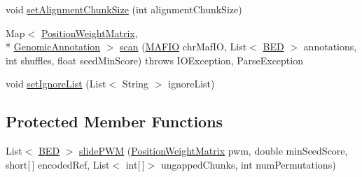 \begin{DoxyCompactItemize}
void \hyperlink{classbroad_1_1core_1_1siphy_1_1_conserved_p_w_m_scanner_a3f966e649abcf8c8215cd049493576e1}{set\+Alignment\+Chunk\+Size} (int alignment\+Chunk\+Size)
\item 
Map$<$ \hyperlink{classbroad_1_1core_1_1motif_1_1_position_weight_matrix}{Position\+Weight\+Matrix}, \\*
\hyperlink{interfacebroad_1_1core_1_1annotation_1_1_genomic_annotation}{Genomic\+Annotation} $>$ \hyperlink{classbroad_1_1core_1_1siphy_1_1_conserved_p_w_m_scanner_a7d0bda7cc27e224befcf4d4f7653ba35}{scan} (\hyperlink{classbroad_1_1core_1_1multiplealignment_1_1_m_a_f_i_o}{M\+A\+F\+I\+O} chr\+Maf\+I\+O, List$<$ \hyperlink{classbroad_1_1core_1_1annotation_1_1_b_e_d}{B\+E\+D} $>$ annotations, int shuffles, float seed\+Min\+Score)  throws I\+O\+Exception, Parse\+Exception 
\item 
void \hyperlink{classbroad_1_1core_1_1siphy_1_1_conserved_p_w_m_scanner_ad8b0d58225f5f42cb4c806dc0490a775}{set\+Ignore\+List} (List$<$ String $>$ ignore\+List)
\end{DoxyCompactItemize}
\subsection*{Protected Member Functions}
\begin{DoxyCompactItemize}
\item 
List$<$ \hyperlink{classbroad_1_1core_1_1annotation_1_1_b_e_d}{B\+E\+D} $>$ \hyperlink{classbroad_1_1core_1_1siphy_1_1_conserved_p_w_m_scanner_ae52325a0d90721ed2ae2afe3d244f578}{slide\+P\+W\+M} (\hyperlink{classbroad_1_1core_1_1motif_1_1_position_weight_matrix}{Position\+Weight\+Matrix} pwm, double min\+Seed\+Score, short\mbox{[}$\,$\mbox{]} encoded\+Ref, List$<$ int\mbox{[}$\,$\mbox{]}$>$ ungapped\+Chunks, int num\+Permutations)
\end{DoxyCompactItemize}


